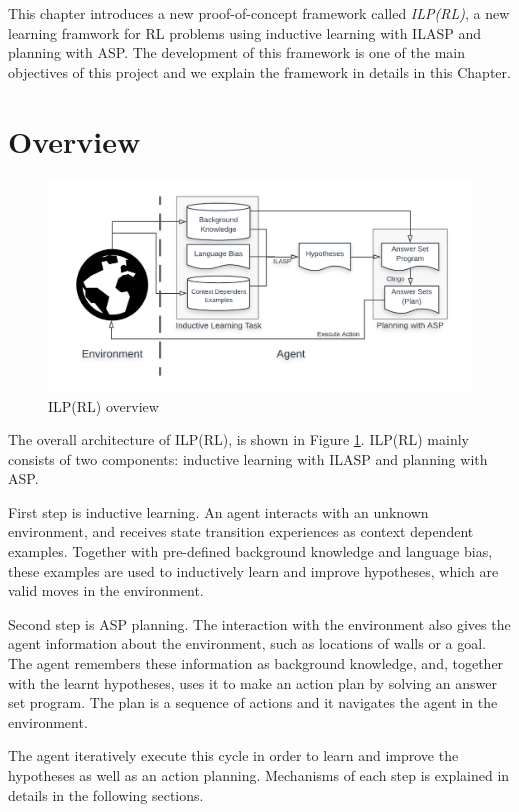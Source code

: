 This chapter introduces a new proof-of-concept framework called \textit{ILP(RL)}, a new learning framwork for RL problems using inductive learning with ILASP and planning with ASP.
The development of this framework is one of the main objectives of this project and we explain the framework in details in this Chapter.

\section{Overview}
\label{sec:overview}

\begin{figure}[!htb]
\centering
\includegraphics[width=1.0\textwidth]{./figures/architecture}
\caption{ILP(RL) overview}
\label{fig:ILPRL_overview}
\end{figure}

The overall architecture of ILP(RL), is shown in Figure \ref{fig:ILPRL_overview}. 
ILP(RL) mainly consists of two components: inductive learning with ILASP and planning with ASP. 

First step is inductive learning. An agent interacts with an unknown environment, 
and receives state transition experiences as context dependent examples. 
Together with pre-defined background knowledge and language bias, these examples are used to inductively learn and improve hypotheses, which are valid moves in the environment.

Second step is ASP planning. The interaction with the environment also gives the agent information about the environment, such as locations of walls or a goal. 
The agent remembers these information as background knowledge, and, 
together with the learnt hypotheses, uses it to make an action plan by solving an answer set program.
The plan is a sequence of actions and it navigates the agent in the environment.

The agent iteratively execute this cycle in order to learn and improve the hypotheses as well as an action planning. 
Mechanisms of each step is explained in details in the following sections.

